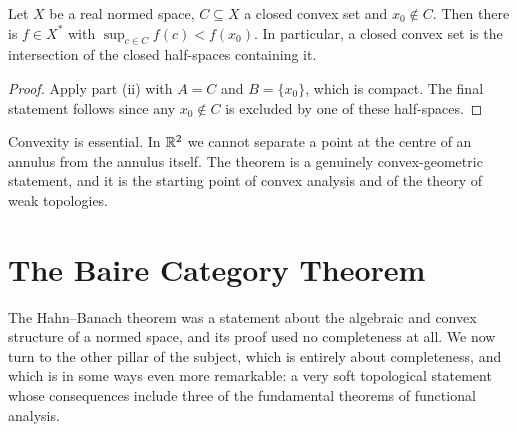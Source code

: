 \documentclass[a4paper]{scrartcl}
\begin{document}
\begin{center}
\end{center}

\begin{corollary}
	Let $X$ be a real normed space, $C \subseteq X$ a closed convex set and $x_0 \notin C$. Then there is $f \in X^*$ with $\sup_{c \in C} f(c) < f(x_0)$. In particular, a closed convex set is the intersection of the closed half-spaces containing it.
\end{corollary}

\begin{proof}
	Apply part (ii) with $A = C$ and $B = \{x_0\}$, which is compact. The final statement follows since any $x_0 \notin C$ is excluded by one of these half-spaces.
\end{proof}

\begin{remark}
	Convexity is essential. In $\mathbb{R}^2$ we cannot separate a point at the centre of an annulus from the annulus itself. The theorem is a genuinely convex-geometric statement, and it is the starting point of convex analysis and of the theory of weak topologies.
\end{remark}

\section{The Baire Category Theorem}

The Hahn--Banach theorem was a statement about the algebraic and convex structure of a normed space, and its proof used no completeness at all. We now turn to the other pillar of the subject, which is entirely about completeness, and which is in some ways even more remarkable: a very soft topological statement whose consequences include three of the fundamental theorems of functional analysis.
\end{document}
